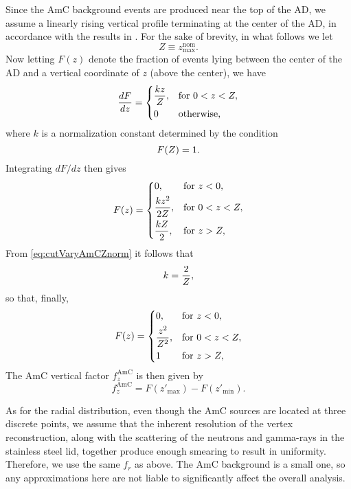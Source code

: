 \documentclass[../thesis.tex]{subfiles}
\begin{document}
Since the AmC background events are produced near the top of the AD, we assume a linearly rising vertical profile terminating at the center of the AD, in accordance with the results in \cite{Gu_2016}. For the sake of brevity, in what follows we let
\begin{equation}
  Z \equiv z_{\mathrm{max}}^{\mathrm{nom}}.
\end{equation}
Now letting $F(z)$ denote the fraction of events lying between the center of the AD and a vertical coordinate of $z$ (above the center), we have
\begin{equation}
  \frac{dF}{dz} =
  \begin{dcases}
    \frac{kz}{Z}, & \mbox{for } 0 < z < Z,\\
    0 & \mbox{otherwise,}
  \end{dcases}
\end{equation}
where $k$ is a normalization constant determined by the condition
\begin{equation}
  \label{eq:cutVaryAmCZnorm}
  F(Z) = 1.
\end{equation}
Integrating $dF/dz$ then gives
\begin{equation}
  F(z) =
  \begin{dcases}
    0, &\mbox{for } z < 0,\\
    \frac{kz^2}{2Z}, &\mbox{for } 0 < z < Z,\\
    \frac{kZ}{2}, &\mbox{for } z > Z,
  \end{dcases}
\end{equation}
From \autoref{eq:cutVaryAmCZnorm} it follows that
\begin{equation}
  k = \frac{2}{Z},
\end{equation}
so that, finally,
\begin{equation}
  F(z) =
  \begin{dcases}
    0, &\mbox{for } z < 0,\\
    \frac{z^2}{Z^2}, &\mbox{for } 0 < z < Z,\\
    1 &\mbox{for } z > Z,
  \end{dcases}
\end{equation}
The AmC vertical factor $f_z^{\mathrm{AmC}}$ is then given by
\begin{equation}
    f_z^{\mathrm{AmC}} = F(z'_{\mathrm{max}}) - F(z'_{\mathrm{min}}).
\end{equation}

As for the radial distribution, even though the AmC sources are located at three discrete points, we assume that the inherent resolution of the vertex reconstruction, along with the scattering of the neutrons and gamma-rays in the stainless steel lid, together produce enough smearing to result in uniformity. Therefore, we use the same $f_r$ as above. The AmC background is a small one, so any approximations here are not liable to significantly affect the overall analysis.
\end{document}
